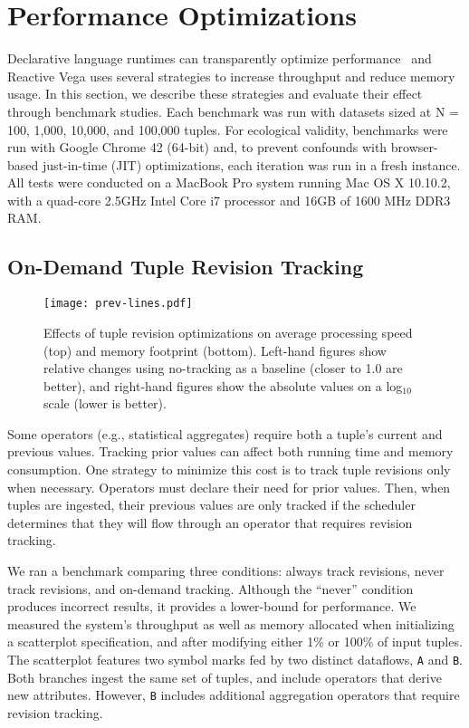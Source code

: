\section{Performance Optimizations}
\label{sec:vg:optimizations}

Declarative language runtimes can transparently optimize
performance~\cite{heer:protovisjava} and Reactive Vega uses several strategies
to increase throughput and reduce memory usage. In this section, we describe
these strategies and evaluate their effect through benchmark studies. Each
benchmark was run with datasets sized at N = 100, 1,000, 10,000, and 100,000
tuples. For ecological validity, benchmarks were run with Google Chrome 42
(64-bit) and, to prevent confounds with browser-based just-in-time (JIT)
optimizations, each iteration was run in a fresh instance. All tests were
conducted on a MacBook Pro system running Mac OS X 10.10.2, with a quad-core
2.5GHz Intel Core i7 processor and 16GB of 1600 MHz DDR3 RAM.

\subsection{On-Demand Tuple Revision Tracking}

\begin{figure}[h!]
  \centering
  \texttt{[image: prev-lines.pdf]}
  \caption{Effects of tuple revision optimizations on average
processing speed (top) and memory footprint (bottom). Left-hand figures show
relative changes using no-tracking as a baseline (closer to 1.0 are better),
and right-hand figures show the absolute values on a log$_{10}$ scale
(lower is better).}
  \label{fig:vg:prev_benchmark}
\end{figure}

Some operators (e.g., statistical aggregates) require both a tuple's current and
previous values. Tracking prior values can affect both running time and memory
consumption. One strategy to minimize this cost is to track tuple revisions only
when necessary. Operators must declare their need for prior values. Then, when
tuples are ingested, their previous values are only tracked if the scheduler
determines that they will flow through an operator that requires revision
tracking.

We ran a benchmark comparing three conditions: always track revisions, never
track revisions, and on-demand tracking. Although the ``never'' condition
produces incorrect results, it provides a lower-bound for performance. We
measured the system's throughput as well as memory allocated when initializing a
scatterplot specification, and after modifying either 1\% or 100\% of input
tuples. The scatterplot features two symbol marks fed by two distinct dataflows,
\texttt{A} and \texttt{B}. Both branches ingest the same set of tuples, and
include operators that derive new attributes. However, \texttt{B} includes
additional aggregation operators that require revision tracking.

